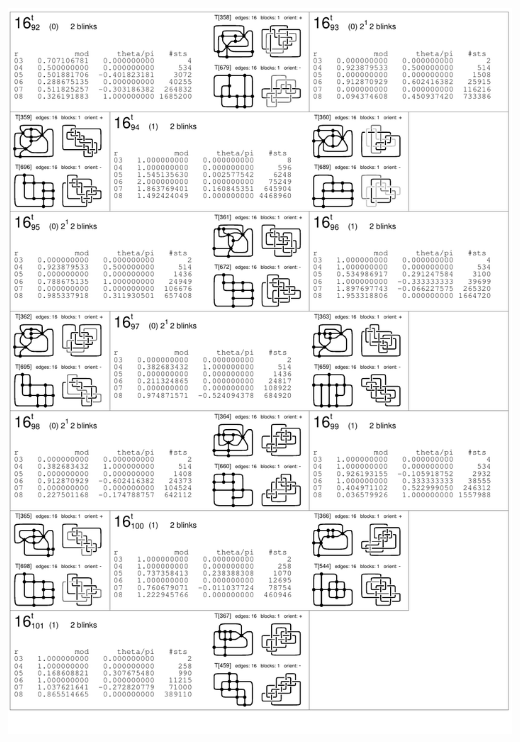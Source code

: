 \begin{center}
 \includegraphics[height=23.5cm]{E.figsbw2/con3catalog024_bw.pdf} \eject 

\end{center}
